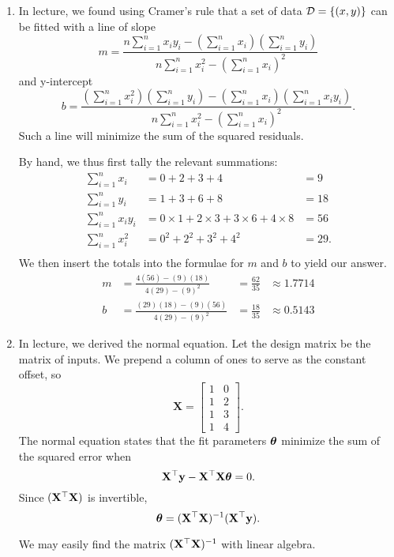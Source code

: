 \documentclass[12pt,letterpaper]{hmcpset}
\begin{document}
\begin{solution}
\begin{enumerate}

\item
In lecture, we found using Cramer's rule that a set of data ${\cal D} = \{(x,y)\}$ can be fitted with a line of slope 
\[
m = \frac{ n \sum_{i=1}^n x_i y_i - (\sum_{i=1}^n x_i)(\sum_{i=1}^n y_i)}
	{n \sum_{i=1}^n x_i^2 - (\sum_{i=1}^n x_i)^2}
\]
and y-intercept
\[
b = \frac{  (\sum_{i=1}^n x_i^2)(\sum_{i=1}^n y_i) - (\sum_{i=1}^n x_i)(\sum_{i=1}^n x_i y_i) }
	{n \sum_{i=1}^n x_i^2 - (\sum_{i=1}^n x_i)^2}.
\]
Such a line will minimize the sum of the squared residuals.

By hand, we thus first tally the relevant summations:
\begin{align*}
\sum_{i=1}^n x_i &=  0 + 2 + 3 + 4 &= 9\\
\sum_{i=1}^n y_i &= 1 + 3 + 6 + 8 &= 18\\
\sum_{i=1}^n x_i y_i &= 0 \times 1 + 2 \times 3  + 3 \times 6 + 4 \times 8 &= 56 \\
\sum_{i=1}^n x_i^2 &= 0^2 + 2^2 + 3^2 + 4^2 &= 29.\\
\end{align*}
We then insert the totals into the formulae for $m$ and $b$ to yield our answer.
\begin{align*}
m &= \frac{4 (56) - (9)(18)}{4(29) - (9)^2}    &= \frac{62}{35} &\approx 1.7714 \\
b &= \frac{ (29)(18) - (9)(56) }{4(29) - (9)^2} &= \frac{18}{35} &\approx 0.5143
\end{align*}

\item
In lecture, we derived the normal equation.
Let the design matrix be the matrix of inputs. We prepend a column of ones to serve as the constant offset, so
\[
\mathbf{X} = 
	\begin{bmatrix} 
    		1 & 0  \\
    		1 & 2  \\
		1 & 3  \\
    		1 & 4 
    \end{bmatrix}.
\]
The normal equation states that the fit parameters $\hbox{\boldmath$\theta$}$ minimize the sum of the squared error when
\[
{\bf X}^\top {\bf y} - {\bf X}^\top {\bf X} \hbox{\boldmath$\theta$} = 0.\\
\]
Since  $({\bf X}^\top {\bf X})$ is invertible, 
\[
\hbox{\boldmath$\theta$} = ({\bf X}^\top {\bf X})^{-1} ({\bf X}^\top {\bf y}).
\]

We may easily find the matrix $({\bf X}^\top {\bf X})^{-1}$ with linear algebra.


\end{enumerate}
\end{solution}
\end{document}
